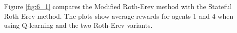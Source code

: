 
Figure \ref{fig:6_1} compares the Modified Roth-Erev method with the Stateful
Roth-Erev method.  The plots show average rewards for agents 1 and 4 when
using Q-learning and the two Roth-Erev variants.


